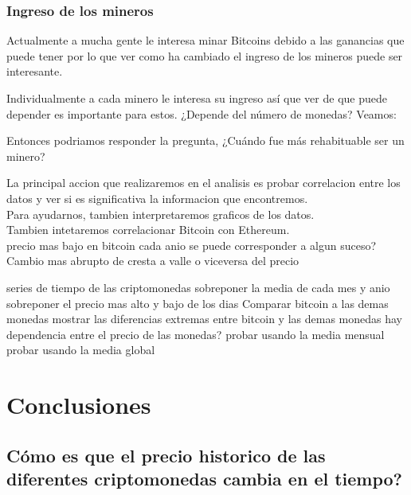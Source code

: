 \documentclass[12pt,letterpaper]{article}
\begin{document}
   \subsubsection*{Ingreso de los mineros}

    Actualmente a mucha gente le interesa minar Bitcoins debido a las ganancias que puede tener por lo que ver como ha cambiado el ingreso de los mineros puede ser interesante.


    Individualmente a cada minero le interesa su ingreso así que ver de que puede depender es importante para estos. ¿Depende del número de monedas? Veamos:


    
    Entonces podriamos responder la pregunta, ¿Cuándo fue más rehabituable ser un minero?








    La principal accion que realizaremos en el analisis es probar correlacion entre los datos y ver si es significativa la informacion que encontremos.
    \\
    Para ayudarnos, tambien interpretaremos graficos de los datos.
    \\
    Tambien intetaremos correlacionar Bitcoin con Ethereum.
    \\
    precio mas bajo en bitcoin cada anio
        se puede corresponder a algun suceso?
    Cambio mas abrupto de cresta a valle o viceversa del precio

    series de tiempo de las criptomonedas
        sobreponer la media de cada mes y anio
    sobreponer el precio mas alto y bajo de los dias
    Comparar bitcoin a las demas monedas
        mostrar las diferencias extremas entre bitcoin y las demas monedas
    hay dependencia entre el precio de las monedas?
        probar usando la media mensual
        probar usando la media global

\section*{Conclusiones}

	\subsection*{C\'omo es que el precio historico de las diferentes criptomonedas cambia en el tiempo?}
\end{document}
